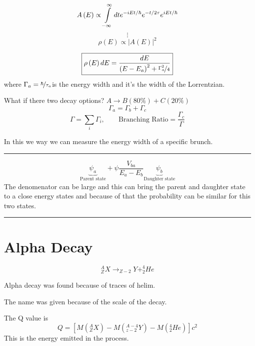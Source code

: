 \documentclass[11pt,a4paper]{article}
\begin{document}
\begin{equation}
    A\left(E\right)\propto\intop^{\infty}_{-\infty}dte^{-iEt/\hbar}e^{-t/2\tau}e^{iEt/\hbar}
\end{equation}
{}
\[
    \vdots
\]
\begin{equation}
    \rho\left(E\right)\propto\left|A\left(E\right)\right|^{2}
\end{equation}

\begin{equation}
    \boxed{\rho\left(E\right)dE=\frac{dE}{\left(E-E_{a}\right)^{2}+\nicefrac{\Gamma^{2}_{a}}{4}}}
\end{equation}
where $\Gamma_{a}=\nicefrac{\hbar}{\tau_{a}}$is the energy width
and it's the width of the Lorrentzian.

What if there two decay options? $A\rightarrow B(80\%)+C(20\%)$
\[
    \Gamma_{a}=\Gamma_{b}+\Gamma_{c}
\]
\begin{equation}
    \Gamma=\sum_{i}\Gamma_{i},\qquad\text{Branching Ratio}=\frac{\Gamma_{c}}{\Gamma}
\end{equation}

In this we way we can measure the energy width of a specific brunch.

\rule[0.5ex]{1\columnwidth}{1pt}

\begin{equation}
    \underset{\text{Parent state}}{\underbrace{\psi_{a}}}+\psi\frac{V_{ba}}{E_{a}-E_{b}}\underset{\text{Daughter state}}{\underbrace{\psi_{b}}}
\end{equation}
The denomenator can be large and this can bring the parent and daughter
state to a close energy states and because of that the probability
can be similar for this two states.

\rule[0.5ex]{1\columnwidth}{1pt}

\section{Alpha Decay}

\begin{equation}
    ^{A}_{Z}X\rightarrow_{Z-2}Y+^{4}_{2}He
\end{equation}

Alpha decay was found because of traces of helim.

The name was given because of the scale of the decay.

The Q value is
\begin{equation}
    Q=\left[M\left(^{A}_{Z}X\right)-M\left(^{A-4}_{z-2}Y\right)-M\left(^{4}_{2}He\right)\right]c^{2}
\end{equation}
This is the energy emitted in the process.
\end{document}

